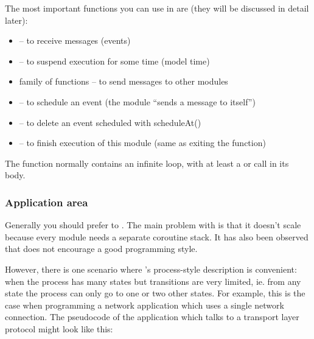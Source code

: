 The most important functions you can use in  are
(they will be discussed in detail later):
\begin{itemize}
\item{ -- to receive messages (events)}
\item{ -- to suspend execution
    for some time (model time)}
\item{ family of functions -- to send messages to other
    modules}
\item{ -- to schedule an event (the module ``sends
    a message to itself'')}
\item{ -- to delete an event scheduled with
    scheduleAt()}
\item{ -- to finish execution of this module (same as
    exiting the  function)}
\end{itemize}

The  function normally contains an infinite loop,
with at least a  or  call in its body.



\subsubsection{Application area}

Generally you should prefer  to .
The main problem with  is that it doesn't scale because
every module needs a separate coroutine stack. It has also been observed
that  does not encourage a good programming style.

However, there is one scenario where 's process-style
description is convenient: when the process has many
states but transitions are very limited, ie. from any state the
process can only go to one or two other states.  For example, this is
the case when programming a network application which uses a single
network connection.  The pseudocode of the application which talks to
a transport layer protocol might look like this:

